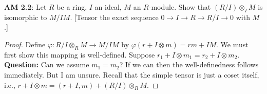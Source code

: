 \documentclass[8pt]{amsart}
\theoremstyle{plain}%
\theoremstyle{definition}
\theoremstyle{remark}
\numberwithin{equation}{section}
\begin{document}
\textbf{ AM 2.2}: Let $R$ be a ring, $I$ an ideal, $M$ an $R$-module. Show that $(R/I) \otimes_IM$ is isomorphic to $M/IM$. [Tensor the exact sequence $0 \longrightarrow I \longrightarrow R \longrightarrow R/I \longrightarrow 0$ with $M$.]
	\begin{proof}
		Define $\varphi : R/I \otimes_RM \to M/IM$ by $\varphi(r + I \otimes m) = rm + IM$. We must first show this mapping is well-defined. Suppose $r_1 + I \otimes m_1 = r_2 + I \otimes m_2$.\\

		\textbf{Question:} Can we assume $m_1 = m_2$? If we can then the well-definedness follows immediately. But I am unsure. Recall that the simple tensor is just a coset itself, i.e., $r + I \otimes m = (r + I, m) + (R/I) \otimes_RM$.
	\end{proof}
\end{document}
